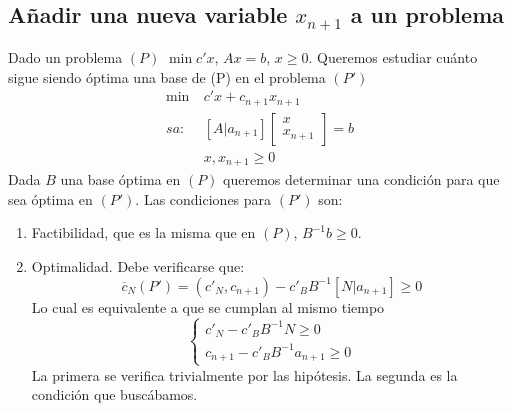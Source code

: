 \documentclass[PM.tex]{subfiles}
\begin{document}
\subsection{Añadir una nueva variable $x_{n+1}$ a un problema}
Dado un problema $(P)$ $\min c'x$, $Ax=b$, $x\geq 0$. Queremos estudiar cuánto sigue siendo óptima una base de (P) en el problema $(P')$
\begin{align*}
\min\ & c'x+c_{n+1}x_{n+1}\\
sa:\ & [A|a_{n+1}]\begin{bmatrix}
x\\
x_{n+1}
\end{bmatrix}=b\\
 &  x,x_{n+1}\geq 0
\end{align*}
Dada $B$ una base óptima en $(P)$ queremos determinar una condición para que sea óptima en $(P')$. Las condiciones para $(P')$ son:
\begin{enumerate}
\item Factibilidad, que es la misma que en $(P)$, $B^{-1}b\geq 0$. 
\item Optimalidad. Debe verificarse que:
\[\overline{c}_N(P')=(c'_N, c_{n+1})-c'_B B^{-1}[N| a_{n+1}]\geq 0\]
Lo cual es equivalente a que se cumplan al mismo tiempo
\[
\begin{cases}c'_N-c'_B B^{-1}N\geq 0\\
c_{n+1}-c'_B B^{-1} a_{n+1}\geq 0\end{cases}\]
La primera se verifica trivialmente por las hipótesis. La segunda es la condición que buscábamos.

\end{enumerate}
\end{document}
